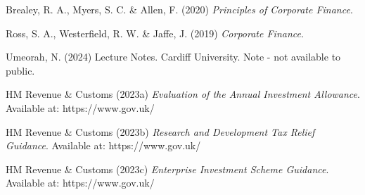\documentclass{article}
\begin{document}
Brealey, R. A., Myers, S. C. \& Allen, F. (2020) \textit{Principles of Corporate Finance}.

Ross, S. A., Westerfield, R. W. \& Jaffe, J. (2019) \textit{Corporate Finance}.

Umeorah, N. (2024) Lecture Notes. Cardiff University. Note - not available to public.

HM Revenue \& Customs (2023a) \textit{Evaluation of the Annual Investment Allowance}. Available at: https://www.gov.uk/

HM Revenue \& Customs (2023b) \textit{Research and Development Tax Relief Guidance}. Available at: https://www.gov.uk/

HM Revenue \& Customs (2023c) \textit{Enterprise Investment Scheme Guidance}. Available at: https://www.gov.uk/
\end{document}
